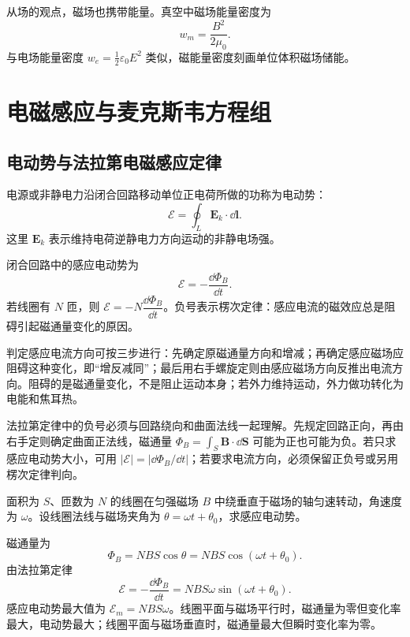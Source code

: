 \begin{definition}[磁场能量密度]\label{def:magnetic-energy-density}
从场的观点，磁场也携带能量。真空中磁场能量密度为
\[
  w_m=\frac{B^2}{2\mu_0}.
\]
与电场能量密度 $w_e=\frac12\varepsilon_0E^2$ 类似，磁能量密度刻画单位体积磁场储能。
\end{definition}

\section{电磁感应与麦克斯韦方程组}

\subsection{电动势与法拉第电磁感应定律}

\begin{definition}[电动势]\label{def:emf}
电源或非静电力沿闭合回路移动单位正电荷所做的功称为电动势：
\[
  \mathcal E=\oint_L \bm E_k\cdot\dd\bm l.
\]
这里 $\bm E_k$ 表示维持电荷逆静电力方向运动的非静电场强。
\end{definition}

\begin{theorem}[法拉第电磁感应定律]\label{thm:faraday-law}
闭合回路中的感应电动势为
\[
  \mathcal E=-\frac{\dd\Phi_B}{\dd t}.
\]
若线圈有 $N$ 匝，则 $\mathcal E=-N\dfrac{\dd\Phi_B}{\dd t}$。负号表示楞次定律：感应电流的磁效应总是阻碍引起磁通量变化的原因。
\end{theorem}

\begin{method}[楞次定律判向]
判定感应电流方向可按三步进行：先确定原磁通量方向和增减；再确定感应磁场应阻碍这种变化，即“增反减同”；最后用右手螺旋定则由感应磁场方向反推出电流方向。阻碍的是磁通量变化，不是阻止运动本身；若外力维持运动，外力做功转化为电能和焦耳热。
\end{method}

\begin{attention}[磁通量的符号约定]
法拉第定律中的负号必须与回路绕向和曲面法线一起理解。先规定回路正向，再由右手定则确定曲面正法线，磁通量 $\Phi_B=\int_S\bm B\cdot\dd\bm S$ 可能为正也可能为负。若只求感应电动势大小，可用 $|\mathcal E|=|\dd\Phi_B/\dd t|$；若要求电流方向，必须保留正负号或另用楞次定律判向。
\end{attention}

\begin{example}[title={矩形线圈在匀强磁场中转动}]\label{eg:rotating-coil-emf}
面积为 $S$、匝数为 $N$ 的线圈在匀强磁场 $B$ 中绕垂直于磁场的轴匀速转动，角速度为 $\omega$。设线圈法线与磁场夹角为 $\theta=\omega t+\theta_0$，求感应电动势。
\begin{solution}
磁通量为
\[
  \Phi_B=NBS\cos\theta=NBS\cos(\omega t+\theta_0).
\]
由法拉第定律
\[
  \mathcal E=-\frac{\dd\Phi_B}{\dd t}
  =NBS\omega\sin(\omega t+\theta_0).
\]
感应电动势最大值为 $\mathcal E_m=NBS\omega$。线圈平面与磁场平行时，磁通量为零但变化率最大，电动势最大；线圈平面与磁场垂直时，磁通量最大但瞬时变化率为零。
\end{solution}
\end{example}


